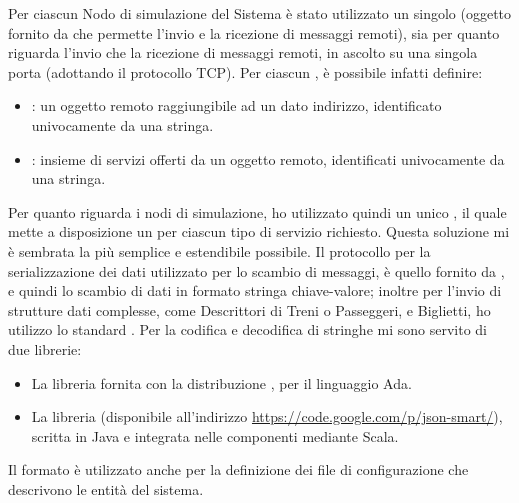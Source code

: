 Per ciascun Nodo di simulazione del Sistema è stato utilizzato un singolo  (oggetto fornito da  che permette l'invio e la ricezione di messaggi remoti), sia per quanto riguarda l'invio che la ricezione di messaggi remoti, in ascolto su una singola porta (adottando il protocollo TCP). Per ciascun , è possibile infatti definire:
	\begin{itemize}
		\item {}: un oggetto remoto raggiungibile ad un dato indirizzo, identificato univocamente da una stringa.
		\item {}: insieme di servizi offerti da un oggetto remoto, identificati univocamente da una stringa.
	\end{itemize}
Per quanto riguarda i nodi di simulazione, ho utilizzato quindi un unico , il quale mette a disposizione un  per ciascun tipo di servizio richiesto. Questa soluzione mi è sembrata la più semplice e estendibile possibile.
Il protocollo per la serializzazione dei dati utilizzato per lo scambio di messaggi, è quello fornito da , e quindi lo scambio di dati in formato stringa chiave-valore; inoltre per l'invio di strutture dati complesse, come Descrittori di Treni o Passeggeri, e Biglietti, ho utilizzo lo standard . Per la codifica e decodifica di stringhe  mi sono servito di due librerie:
	\begin{itemize}
		\item La libreria  fornita con la distribuzione , per il linguaggio Ada.
		\item La libreria  (disponibile all'indirizzo \url{https://code.google.com/p/json-smart/}), scritta in Java e integrata nelle componenti mediante  Scala.
		
	\end{itemize}
	Il formato  è utilizzato anche per la definizione dei file di configurazione che descrivono le entità del sistema.



